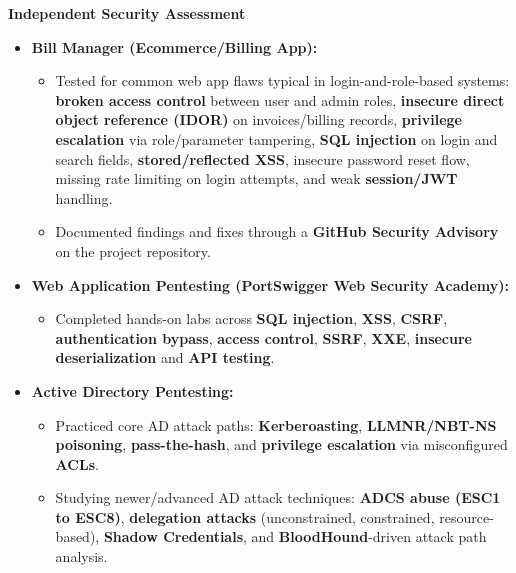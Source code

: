 \documentclass[9pt,a4paper]{extarticle}
\begin{document}
\vspace{3pt}
\noindent\textbf{Independent Security Assessment}
\begin{itemize}
  \item \textbf{Bill Manager (Ecommerce/Billing App):}
  \begin{itemize}
    \item Tested for common web app flaws typical in login-and-role-based systems:
          \textbf{broken access control} between user and admin roles, \textbf{insecure direct
          object reference (IDOR)} on invoices/billing records, \textbf{privilege
          escalation} via role/parameter tampering, \textbf{SQL injection} on login and
          search fields, \textbf{stored/reflected XSS}, insecure password reset flow,
          missing rate limiting on login attempts, and weak \textbf{session/JWT} handling.
    \item Documented findings and fixes through a \textbf{GitHub Security Advisory} on
          the project repository.
  \end{itemize}

  \item \textbf{Web Application Pentesting (PortSwigger Web Security Academy):}
  \begin{itemize}
    \item Completed hands-on labs across \textbf{SQL injection}, \textbf{XSS}, \textbf{CSRF}, \textbf{authentication
          bypass}, \textbf{access control}, \textbf{SSRF}, \textbf{XXE}, \textbf{insecure deserialization} and \textbf{API testing}.
  \end{itemize}

  \item \textbf{Active Directory Pentesting:}
  \begin{itemize}
    \item Practiced core AD attack paths: \textbf{Kerberoasting}, \textbf{LLMNR/NBT-NS poisoning},
          \textbf{pass-the-hash}, and \textbf{privilege escalation} via misconfigured \textbf{ACLs}.
    \item Studying newer/advanced AD attack techniques: \textbf{ADCS abuse (ESC1 to ESC8)},
          \textbf{delegation attacks} (unconstrained, constrained, resource-based),
          \textbf{Shadow Credentials}, and \textbf{BloodHound}-driven attack path analysis.
  \end{itemize}
\end{itemize}
\end{document}
